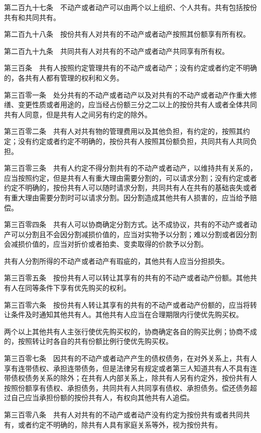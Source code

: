 \documentclass[UTF8,12pt,a4paper]{ctexbook}
\begin{document}
第二百九十七条　不动产或者动产可以由两个以上组织、个人共有。共有包括按份共有和共同共有。

第二百九十八条　按份共有人对共有的不动产或者动产按照其份额享有所有权。

第二百九十九条　共同共有人对共有的不动产或者动产共同享有所有权。

第三百条　共有人按照约定管理共有的不动产或者动产；没有约定或者约定不明确的，各共有人都有管理的权利和义务。

第三百零一条　处分共有的不动产或者动产以及对共有的不动产或者动产作重大修缮、变更性质或者用途的，应当经占份额三分之二以上的按份共有人或者全体共同共有人同意，但是共有人之间另有约定的除外。

第三百零二条　共有人对共有物的管理费用以及其他负担，有约定的，按照其约定；没有约定或者约定不明确的，按份共有人按照其份额负担，共同共有人共同负担。

第三百零三条　共有人约定不得分割共有的不动产或者动产，以维持共有关系的，应当按照约定，但是共有人有重大理由需要分割的，可以请求分割；没有约定或者约定不明确的，按份共有人可以随时请求分割，共同共有人在共有的基础丧失或者有重大理由需要分割时可以请求分割。因分割造成其他共有人损害的，应当给予赔偿。

第三百零四条　共有人可以协商确定分割方式。达不成协议，共有的不动产或者动产可以分割且不会因分割减损价值的，应当对实物予以分割；难以分割或者因分割会减损价值的，应当对折价或者拍卖、变卖取得的价款予以分割。

共有人分割所得的不动产或者动产有瑕疵的，其他共有人应当分担损失。

第三百零五条　按份共有人可以转让其享有的共有的不动产或者动产份额。其他共有人在同等条件下享有优先购买的权利。

第三百零六条　按份共有人转让其享有的共有的不动产或者动产份额的，应当将转让条件及时通知其他共有人。其他共有人应当在合理期限内行使优先购买权。

两个以上其他共有人主张行使优先购买权的，协商确定各自的购买比例；协商不成的，按照转让时各自的共有份额比例行使优先购买权。

第三百零七条　因共有的不动产或者动产产生的债权债务，在对外关系上，共有人享有连带债权、承担连带债务，但是法律另有规定或者第三人知道共有人不具有连带债权债务关系的除外；在共有人内部关系上，除共有人另有约定外，按份共有人按照份额享有债权、承担债务，共同共有人共同享有债权、承担债务。偿还债务超过自己应当承担份额的按份共有人，有权向其他共有人追偿。

第三百零八条　共有人对共有的不动产或者动产没有约定为按份共有或者共同共有，或者约定不明确的，除共有人具有家庭关系等外，视为按份共有。
\end{document}
